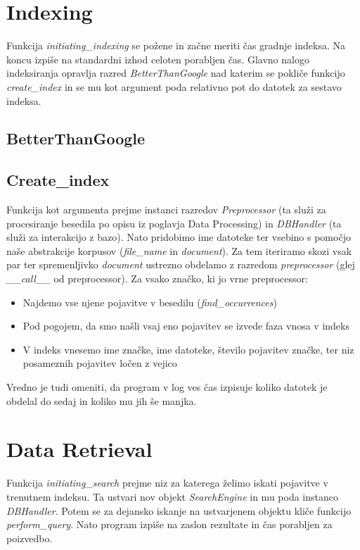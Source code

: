 \documentclass[runningheads]{llncs}
\begin{document}
\section{Indexing}
Funkcija \textit{initiating\_indexing} se požene in začne meriti čas gradnje indeksa. Na koncu izpiše na standardni izhod celoten porabljen čas. Glavno nalogo indeksiranja opravlja razred \textit{BetterThanGoogle} nad katerim se pokliče funkcijo \textit{create\_index} in se mu kot argument poda relativno pot do datotek za sestavo indeksa.

\subsection{BetterThanGoogle}

\subsection{Create\_index}
Funkcija kot argumenta prejme instanci razredov \textit{Preprocessor} (ta služi za procesiranje besedila po opisu iz poglavja Data Processing) in \textit{DBHandler} (ta služi za interakcijo z bazo). Nato pridobimo ime datoteke ter vsebino s pomočjo naše abstrakcije korpusov (\textit{file\_name} in \textit{document}). Za tem iteriramo skozi vsak par ter spremenljivko \textit{document} ustrezno obdelamo z razredom \textit{preprocessor} (glej \textit{\_\_call\_\_} od preprocessor). Za vsako značko, ki jo vrne preprocessor:
\begin{itemize}
\item Najdemo vse njene pojavitve v besedilu (\textit{find\_occurrences})
\item Pod pogojem, da smo našli vsaj eno pojavitev se izvede faza vnosa v indeks
\item V indeks vnesemo ime značke, ime datoteke, število pojavitev značke, ter niz posameznih pojavitev ločen z vejico
\end{itemize}
Vredno je tudi omeniti, da program v log ves čas izpisuje koliko datotek je obdelal do sedaj in koliko mu jih še manjka.


\section{Data Retrieval}
Funkcija \textit{initiating\_search} prejme niz za katerega želimo iskati pojavitve v trenutnem indeksu.
Ta ustvari nov objekt \textit{SearchEngine} in mu poda instanco \textit{DBHandler}. Potem se za dejansko iskanje na ustvarjenem objektu kliče funkcijo \textit{perform\_query}. Nato program izpiše na zaslon rezultate in čas porabljen za poizvedbo.
\end{document}
